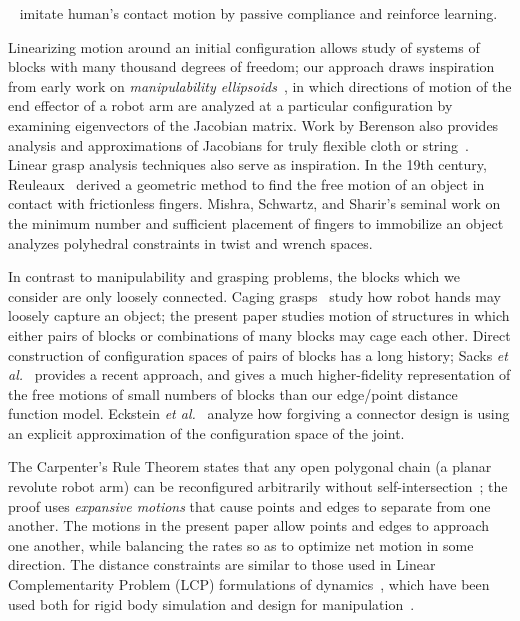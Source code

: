 \documentclass[11pt, twocolumn]{article}
\begin{document}
~\cite{yun2008compliant} imitate human's contact motion by passive compliance and reinforce learning.

Linearizing motion around an initial configuration allows study of systems of blocks with many thousand degrees of freedom; our approach draws inspiration from early work on {\em manipulability ellipsoids}~\cite{Chiacchio1991-manipulability,Park1998-manipulability,Kim1998-manipulability,Bicchi2000-manipulability}, in which directions of motion of the end effector of a robot arm are analyzed at a particular configuration by examining eigenvectors of the Jacobian matrix. Work by Berenson also provides analysis and approximations of Jacobians for truly flexible cloth or string~\cite{Berenson2013-deformable}. Linear grasp analysis techniques also serve as inspiration. In the 19th century, Reuleaux~\cite{Reuleaux1876} derived a geometric method to find the free motion of an object in contact with frictionless fingers. Mishra, Schwartz, and Sharir's seminal work on the minimum number and sufficient placement of fingers to immobilize an object~\cite{Mishra1987-grasp-existence} analyzes polyhedral constraints in twist and wrench spaces.

In contrast to manipulability and grasping problems, the blocks which we consider are only loosely connected. Caging grasps~\cite{RodriguezMF12,makita2008,vahedi2008caging,erickson2003capturing,rimon1996caging,allen2015two,Makita2017-caging-survey} study how robot hands may loosely capture an object; the present paper studies motion of structures in which either pairs of blocks or combinations of many blocks may cage each other. Direct construction of configuration spaces of pairs of blocks has a long history; Sacks {\em et al.}~\cite{SacksBM17} provides a recent approach, and gives a much higher-fidelity representation of the free motions of small numbers of blocks than our edge/point distance function model. Eckstein {\em et al.}~\cite{Eckenstein2017-acceptance-area-connectors} analyze how forgiving a connector design is using an explicit approximation of the configuration space of the joint.

The Carpenter's Rule Theorem states that any open polygonal chain (a planar revolute robot arm) can be reconfigured arbitrarily without self-intersection~\cite{Connelly2003-carpenters}; the proof uses {\em expansive motions} that cause points and edges to separate from one another. The motions in the present paper allow points and edges to approach one another, while balancing the rates so as to optimize net motion in some direction. The distance constraints are similar to those used in Linear Complementarity Problem (LCP) formulations of dynamics~\cite{STsiam97,TTPrs01}, which have been used both for rigid body simulation and design for manipulation~\cite{Balkcom2002b}.
\end{document}
